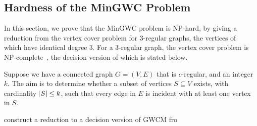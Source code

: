 \documentclass[10pt,twocolumn,twoside]{IEEEtran}
\begin{document}
\subsection{Hardness of the MinGWC Problem}

In this section, we prove that  the MinGWC problem is NP-hard, by giving a reduction from the vertex cover problem for 3-regular graphs, the vertices of which have identical degree 3. For a 3-regular graph, the vertex cover problem is NP-complete~\cite{FrHeJa98}, the decision version of which is stated below.

\begin{problem}
Suppose we have a connected graph \(G=(V,E)\) that is \(c\)-regular, and an integer \(k\). The aim is to determine whether a subset of vertices \(S\subseteq V\) exists, with cardinality \(\left|S \right|\le k\), such that every edge in \(E\) is incident with at least one vertex in \(S\).
\end{problem}

construct a reduction to a decision version of GWCM fro
\end{document}

